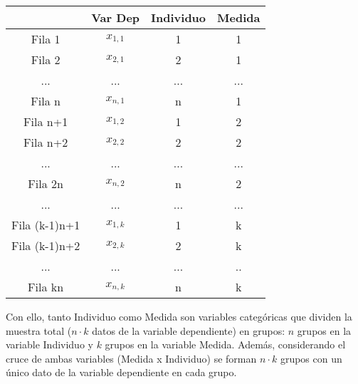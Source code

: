 \begin{center}
\begin{tabular}{|l|l|l|l|}
\cline{2-4}
\multicolumn{1}{c|}{} & \multicolumn{1}{c|}{Var Dep} & \multicolumn{1}{c|}{Individuo} & \multicolumn{1}{c|}{Medida} \\
\hline
\multicolumn{1}{|c|}{Fila 1} & \multicolumn{1}{c|}{$x_{1,1}$} & \multicolumn{1}{c|}{1} & \multicolumn{1}{c|}{1} \\
\hline
\multicolumn{1}{|c|}{Fila 2} & \multicolumn{1}{c|}{$x_{2,1}$} & \multicolumn{1}{c|}{2} & \multicolumn{1}{c|}{1} \\
\hline
\multicolumn{1}{|c|}{...} & \multicolumn{1}{c|}{...} & \multicolumn{1}{c|}{...} & \multicolumn{1}{c|}{...} \\
\hline
\multicolumn{1}{|c|}{Fila n} & \multicolumn{1}{c|}{$x_{n,1}$} & \multicolumn{1}{c|}{n} & \multicolumn{1}{c|}{1} \\
\hline
\multicolumn{1}{|c|}{Fila n+1} & \multicolumn{1}{c|}{$x_{1,2}$} & \multicolumn{1}{c|}{1} & \multicolumn{1}{c|}{2} \\
\hline
\multicolumn{1}{|c|}{Fila n+2} & \multicolumn{1}{c|}{$x_{2,2}$} & \multicolumn{1}{c|}{2} & \multicolumn{1}{c|}{2} \\
\hline
\multicolumn{1}{|c|}{...} & \multicolumn{1}{c|}{...} & \multicolumn{1}{c|}{...} & \multicolumn{1}{c|}{...} \\
\hline
\multicolumn{1}{|c|}{Fila 2n} & \multicolumn{1}{c|}{$x_{n,2}$} & \multicolumn{1}{c|}{n} & \multicolumn{1}{c|}{2} \\
\hline
\multicolumn{1}{|c|}{...} & \multicolumn{1}{c|}{...} & \multicolumn{1}{c|}{...} & \multicolumn{1}{c|}{...} \\
\hline
\multicolumn{1}{|c|}{Fila (k-1)n+1} & \multicolumn{1}{c|}{$x_{1,k}$} & \multicolumn{1}{c|}{1} & \multicolumn{1}{c|}{k} \\
\hline
\multicolumn{1}{|c|}{Fila (k-1)n+2} & \multicolumn{1}{c|}{$x_{2,k}$} & \multicolumn{1}{c|}{2} & \multicolumn{1}{c|}{k} \\
\hline
\multicolumn{1}{|c|}{...} & \multicolumn{1}{c|}{...} & \multicolumn{1}{c|}{...} & \multicolumn{1}{c|}{..} \\
\hline
\multicolumn{1}{|c|}{Fila kn} & \multicolumn{1}{c|}{$x_{n,k}$} & \multicolumn{1}{c|}{n} & \multicolumn{1}{c|}{k} \\
\hline
\end{tabular}
\end{center}

Con ello, tanto Individuo como Medida son variables categóricas que dividen la muestra total ($n\cdot k$ datos de la variable dependiente)
en grupos: $n$ grupos en la variable Individuo y $k$ grupos en la variable Medida. Además, considerando el cruce de ambas variables (Medida
x Individuo) se forman $n\cdot k$ grupos con un único dato de la variable dependiente en cada grupo.

